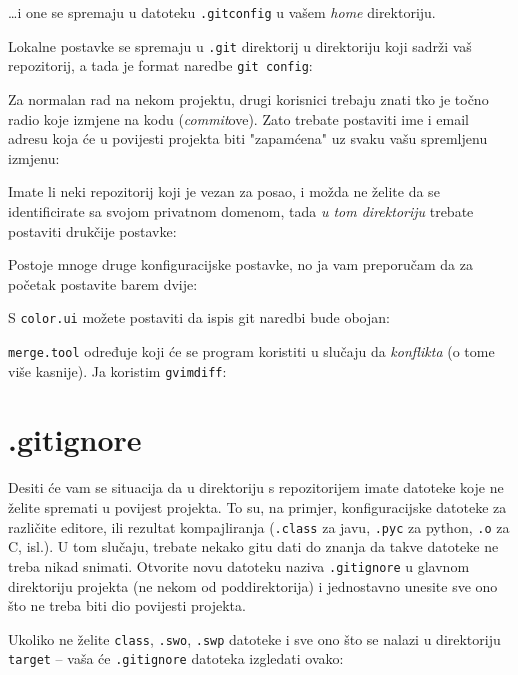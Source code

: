 \dots{}i one se spremaju u datoteku \verb+.gitconfig+ u vašem \emph{home} direktoriju.

Lokalne postavke se spremaju u \verb+.git+ direktorij u direktoriju koji sadrži vaš repozitorij, a tada je format naredbe \verb+git config+:


Za normalan rad na nekom projektu, drugi korisnici trebaju znati tko je točno radio koje izmjene na kodu (\emph{commit}ove).
Zato trebate postaviti ime i email adresu koja će u povijesti projekta biti "zapamćena" uz svaku vašu spremljenu izmjenu:



Imate li neki repozitorij koji je vezan za posao, i možda ne želite da se identificirate sa svojom privatnom domenom, tada \emph{u tom direktoriju} trebate postaviti drukčije postavke:



Postoje mnoge druge konfiguracijske postavke, no ja vam preporučam da za početak postavite barem dvije:

S \verb+color.ui+ možete postaviti da ispis git naredbi bude obojan:



\verb+merge.tool+ određuje koji će se program koristiti u slučaju da \emph{konflikta} (o tome više kasnije). Ja koristim \verb+gvimdiff+:



\section*{.gitignore}

Desiti će vam se situacija da u direktoriju s repozitorijem imate datoteke koje ne želite spremati u povijest projekta.
To su, na primjer, konfiguracijske datoteke za različite editore, ili rezultat kompajliranja (\verb+.class+ za javu, \verb+.pyc+ za python, \verb+.o+ za C, isl.).
U tom slučaju, trebate nekako gitu dati do znanja da takve datoteke ne treba nikad snimati.
Otvorite novu datoteku naziva \verb+.gitignore+ u glavnom direktoriju projekta (ne nekom od poddirektorija) i jednostavno unesite sve ono što ne treba biti dio povijesti projekta.

Ukoliko ne želite \verb+class+, \verb+.swo+, \verb+.swp+ datoteke i sve ono što se nalazi u direktoriju \verb+target+ -- vaša će \verb+.gitignore+ datoteka izgledati ovako:

